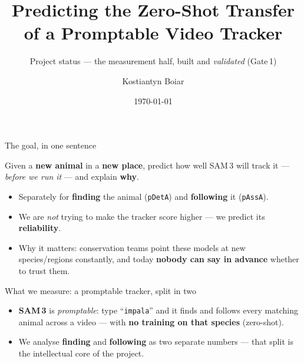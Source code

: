 \documentclass[aspectratio=169,11pt]{beamer}
\title[Project status]{Predicting the Zero-Shot Transfer of a Promptable Video Tracker}
\subtitle{Project status --- the measurement half, built and \emph{validated} (Gate\,1)}
\author{Kostiantyn Boiar}
\institute{MSc Dissertation \,\textbullet\, University of Glasgow\\[2pt]
\small Supervisor: Dr Marwa Mahmoud}
\date{\today}
\begin{document}
\begin{frame}[plain]
  \titlepage
\end{frame}

\begin{frame}{The goal, in one sentence}
  \begin{block}{}
    \centering\large
    Given a \textbf{new animal} in a \textbf{new place}, predict how well SAM\,3 will track it ---
    \emph{before we run it} --- and explain \textbf{why}.
  \end{block}
  \vspace{0.6em}
  \begin{itemize}
    \item Separately for \textbf{finding} the animal (\texttt{pDetA}) and \textbf{following} it (\texttt{pAssA}).
    \item We are \emph{not} trying to make the tracker score higher --- we predict its \textbf{reliability}.
    \item Why it matters: conservation teams point these models at new species/regions constantly, and
          today \textbf{nobody can say in advance} whether to trust them.
  \end{itemize}
\end{frame}

\begin{frame}{What we measure: a promptable tracker, split in two}
  \centering
  \vspace{0.6em}
  \begin{itemize}\footnotesize
    \item \textbf{SAM\,3} is \emph{promptable}: type ``\texttt{impala}'' and it finds and follows every
          matching animal across a video --- with \textbf{no training on that species} (zero-shot).
    \item We analyse \textbf{finding} and \textbf{following} as two separate numbers --- that split is the
          intellectual core of the project.
  \end{itemize}
\end{frame}
\end{document}
